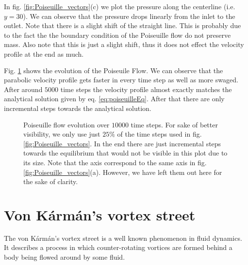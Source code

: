 \documentclass[a4paper,11pt, footsepline]{book}
\begin{document}
In fig. \ref{fig:Poiseuille_vectors}(c) we plot the pressure along the centerline (i.e. $y=30$). We can observe that the pressure drops linearly from the inlet to the outlet. Note that there is a slight shift of the straight line. This is probably due to the fact the the boundary condition of the Poiseuille flow do not preserve mass. Also note that this is just a slight shift, thus it does not effect the velocity profile at the end as much.

Fig. \ref{fig:Poiseuille_evolution} shows the evolution of the Poiseuile Flow. We can observe that the parabolic velocity profile gets faster in every time step as well as more swaged. After around $5000$ time steps the velocity profile almost exactly matches the analytical solution given by eq. \ref{eq:poiseuilleEq}. After that there are only incremental steps towards the analytical solution.
\begin{figure}
  \begin{center}
	\scalebox{0.7}{}
   \caption{Poiseuille flow evolution over $10000$ time steps. For sake of better visibility, we only use just $25\%$ of the time steps used in fig. \ref{fig:Poiseuille_vectors}. In the end there are just incremental steps towards the equilibrium that would not be visible in this plot due to its size. Note that the axis correspond to the same axis in fig. \ref{fig:Poiseuille_vectors}(a). However, we have left them out here for the sake of clarity.}
  \label{fig:Poiseuille_evolution}
  \end{center}
\end{figure}
\section{Von K\'{a}rm\'{a}n's vortex street}\label{sec-karman}
The von K\'{a}rm\'{a}n's vortex street is a well known phenomenon in fluid dynamics. It describes a process in which counter-rotating vortices are formed behind a body being flowed around by some fluid.
\end{document}
